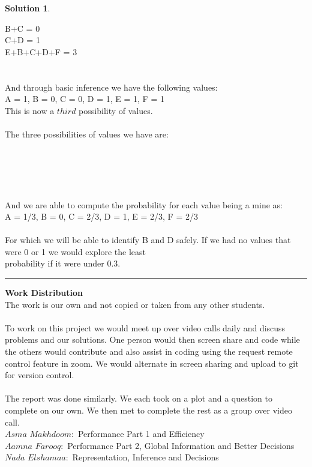 \documentclass{article}
\theoremstyle{definition}
\def\fline{\rule{0.75\linewidth}{0.5pt}}
\newcommand{\finishline}{\vspace{-15pt}\begin{center}\fline\end{center}}
\newtheorem*{solution*}{Solution}
\newenvironment{solution}{\begin{solution*}}{{\finishline} \end{solution*}}
\begin{document}
\begin{solution}
\begin{tabbing}
    \>B+C = 0 \\
	\>C+D = 1\\
	\>E+B+C+D+F = 3\=\\
     \\\\
    And through basic inference we have the following values: \\
    {A = 1, B = 0, C = 0, D = 1, E = 1, F = 1}\\
    This is now a $third$ possibility of values. \\\\
     
    The three possibilities of values we have are: \\\\
    \\
    \\
    \\
    
    \\And we are able to compute the probability for each value being a mine as: \\
    {A = 1/3, B = 0, C = 2/3, D = 1, E = 2/3, F = 2/3}\\\\
    
    For which we will be able to identify B and D safely. If we had no values that were 0 or 1 we would explore the least \\probability if it were under 0.3.
     
    
    \end{tabbing}
\end{solution}

\textbf{Work Distribution}
\\
The work is our own and not copied or taken from any other students. 
\\\\
To work on this project we would meet up over video calls daily and discuss problems and our solutions. One person would then screen share and code while the others would contribute and also assist in coding using the request remote control feature in zoom. We would alternate in screen sharing and upload to git for version control. 
\\\\
The report was done similarly. We each took on a plot and a question to complete on our own. We then met to complete the rest as a group over video call. 
\\
$Asma$ $Makhdoom:$ Performance Part 1 and Efficiency
\\
$Aamna$ $Farooq:$ Performance Part 2, Global Information and Better Decisions
\\
$Nada$ $Elshamaa:$ Representation, Inference and Decisions
\\
\smallskip
\end{document}
